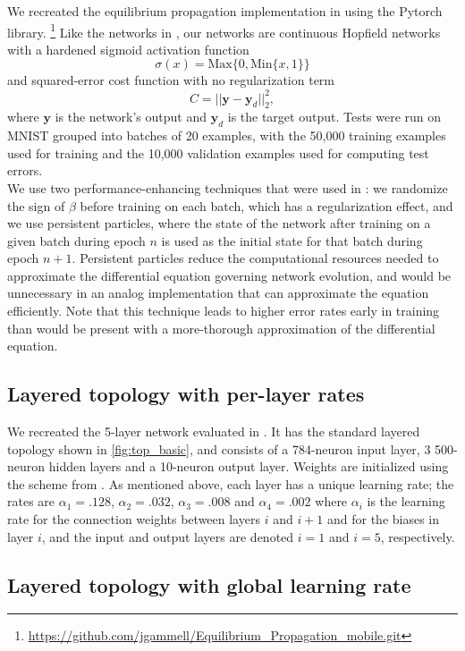 \documentclass[utf8]{frontiersSCNS}
\newcommand{\mtx}[1]{\bm{#1}}
\newcommand{\npar}{\\\indent}
\begin{document}
We recreated the equilibrium propagation implementation in \cite{scellier17} using the Pytorch library.
\footnote{\url{https://github.com/jgammell/Equilibrium_Propagation_mobile.git}}
 Like the networks in \cite{scellier17}, our networks are continuous Hopfield networks with a hardened sigmoid activation function $$\sigma(x)=\text{Max}\{0, \text{Min}\{x, 1\}\}$$ and squared-error cost function with no regularization term $$C=||\mtx{y}-\mtx{y}_d||_2^2,$$ where $\mtx{y}$ is the network's output and $\mtx{y}_d$ is the target output. Tests were run on MNIST \cite{mnist1998} grouped into batches of 20 examples, with the 50,000 training examples used for training and the 10,000 validation examples used for computing test errors.
\npar
We use two performance-enhancing techniques that were used in \cite{scellier17}: we randomize the sign of $\beta$ before training on each batch, which has a regularization effect, and we use persistent particles, where the state of the network after training on a given batch during epoch $n$ is used as the initial state for that batch during epoch $n+1$. Persistent particles reduce the computational resources needed to approximate the differential equation governing network evolution, and would be unnecessary in an analog implementation that can approximate the equation efficiently. Note that this technique leads to higher error rates early in training than would be present with a more-thorough approximation of the differential equation.

\subsection{Layered topology with per-layer rates}
\label{sec:basic_topology}

We recreated the 5-layer network evaluated in \cite{scellier17}. It has the standard layered topology shown in \ref{fig:top_basic}, and consists of a 784-neuron input layer, 3 500-neuron hidden layers and a 10-neuron output layer. Weights are initialized using the scheme from \cite{glorot2010}. As mentioned above, each layer has a unique learning rate; the rates are $\alpha_1=.128$, $\alpha_2=.032$, $\alpha_3=.008$ and $\alpha_4=.002$ where $\alpha_i$ is the learning rate for the connection weights between layers $i$ and $i+1$ and for the biases in layer $i$, and the input and output layers are denoted $i=1$ and $i=5$, respectively.

\subsection{Layered topology with global learning rate}
\label{sec:basic_topology_uniform}
\end{document}
